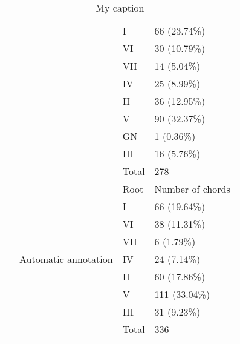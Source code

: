 \begin{table}[]
\begin{tabular}{|l|c|l|l|}
 &  & I & 66 (23.74\%) \\ \cline{3-4}
 &  & VI & 30 (10.79\%) \\ \cline{3-4}
 &  & VII & 14 (5.04\%) \\ \cline{3-4}
 &  & IV & 25 (8.99\%) \\ \cline{3-4}
 &  & II & 36 (12.95\%) \\ \cline{3-4}
 &  & V & 90 (32.37\%) \\ \cline{3-4}
 &  & GN & 1 (0.36\%) \\ \cline{3-4}
 &  & III & 16 (5.76\%) \\ \cline{3-4}
 &  & Total & 278 \\ \cline{2-4}
 & \multirow{9}{*}{Automatic annotation} & Root & Number of chords \\ \cline{3-4}
 &  & I & 66 (19.64\%) \\ \cline{3-4}
 &  & VI & 38 (11.31\%) \\ \cline{3-4}
 &  & VII & 6 (1.79\%) \\ \cline{3-4}
 &  & IV & 24 (7.14\%) \\ \cline{3-4}
 &  & II & 60 (17.86\%) \\ \cline{3-4}
 &  & V & 111 (33.04\%) \\ \cline{3-4}
 &  & III & 31 (9.23\%) \\ \cline{3-4}
 &  & Total & 336 \\ \hline
\end{tabular}
\caption{My caption}
\label{my-label}
\end{table}

\newpage
